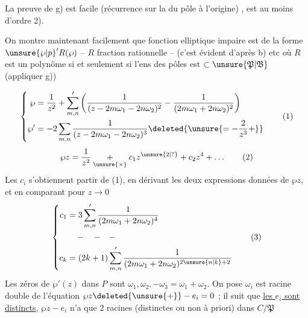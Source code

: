 La preuve de g) est  facile (récurrence sur la  du pôle à l'origine) , est au moins d'ordre 2).

On montre maintenant  facilement que  fonction elliptique impaire est de la forme $\mathord{\unsure{\wp|p}}'R(\wp)$ -- $R$ fraction rationnelle -- (c'est évident d'après b) etc où $R$ est un polynôme si et seulement si l'ens des pôles est $\subset\unsure{\mathfrak P|\mathfrak B}$ (appliquer g))

\noindent {} 

\[
\left\{\begin{aligned}
\wp&=\frac1{z^2}+\sum_{m,n}'\left(\frac1{(z-2m\omega_1-2n\omega_2)^2}-\frac1{(2m\omega_1+2n\omega_2)^2}\right)\\
\wp'&=-2\sum_{m,n}\frac1{(z-2m\omega_1-2n\omega_2)^3}\deleted{\unsure{=-\frac2{z^3}+}}
\end{aligned}\right.\tag*{(1)}
\]
\[
\wp z=\frac1{z^2}\underset{\unsure{\times}}{+}c_1z^{\unsure{2|?}}+c_2z^4+\ldots\tag*{(2)}
\]
Les $c_i$ s'obtiennent  partir de (1), en dérivant les deux expressions données de $\wp z$, et en comparant pour $z\to0$
\[
\left\{\begin{aligned}
c_1&=3\sum_{m,n}'\frac1{(2m\omega_1+2n\omega_2)^4}\\
&\quad -\quad -\quad -\\
c_k&=(2k+1)\sum_{m,n}'\frac1{(2m\omega_1+2n\omega_2)^{2\unsure{n|k}+2}}
\end{aligned}\right.\tag*{(3)}
\]
Les zéros de $\wp'(z)$ dans $P$ sont $\omega_1,\omega_2,-\omega_3=\omega_1+\omega_2$. On pose  $\omega_i$ est racine double de l'équation $\wp z\deleted{\unsure{+}}-e_i=0$ ; il suit que \uline{les $e_i$ sont distincts},  $\wp z-e_i$ n'a que $2$ racines (distinctes ou non à priori) dans $C/\mathfrak P$

